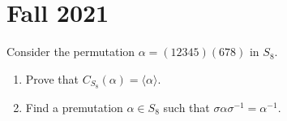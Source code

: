 \documentclass[a4paper]{article}
\begin{document}
\section{Fall 2021}

\begin{problem}
    Consider the permutation \( \alpha = (12345)(678) \) in \( {S}_{8} \). 
    \begin{enumerate}
        \item[(a)] Prove that \( {C}_{{S}_{8}}(\alpha) = \langle \alpha \rangle \).
        \item[(b)] Find a premutation \( \alpha \in {S}_{8} \) such that \( \sigma \alpha \sigma^{-1} = \alpha^{-1} \).
    \end{enumerate}
\end{problem}
\end{document}
